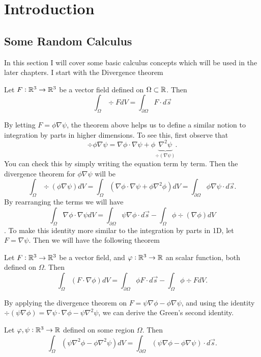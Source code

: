\chapter{Introduction}




\section{Some Random Calculus}
In this section I will cover some basic calculus concepts which will be used in the later chapters. I start with the Divergence theorem

\begin{theorem}
	Let $F:\mathbb{R}^3 \to \mathbb{R}^3$ be a vector field defined on $\Omega \subset \mathbb{R}$. Then
	\[ \int_{\Omega}\div{F}dV = \int_{\partial \Omega} F \cdot d\vec{s} \]
\end{theorem}

By letting $F = \phi\nabla\psi$, the theorem above helps us to define a similar notion to integration by parts in higher dimensions. To see this, first observe that
\[ \div{\phi\nabla\psi} = \nabla\phi\cdot\nabla\psi + \phi\underbrace{\nabla^2\psi}_{\div{(\nabla\psi)}}.  \]
You can check this by simply writing the equation term by term. Then the divergence theorem for $\phi\nabla\psi$ will be
\[ \int_\Omega \div{(\phi\nabla\psi)}dV = \int_\Omega (\nabla\phi\cdot\nabla\psi + \phi \nabla^2\phi) dV = \int_{\partial\Omega}\phi\nabla\psi\cdot d\vec{s}. \]
By rearranging the terms we will have
\[ \int_\Omega \nabla\phi\cdot\nabla\psi dV = \int_{\partial\Omega}\psi\nabla\phi \cdot d\vec{s} - \int_\Omega \phi \div{(\nabla\phi)} dV \].
To make this identity more similar to the integration by parts in 1D, let $F=\nabla\psi$. Then we will have the following theorem
\begin{theorem}
	Let $F:\mathbb{R}^3\to\mathbb{R}^3$ be a vector field, and $\varphi:\mathbb{R}^3\to\mathbb{R}$ an scalar function, both defined on $\Omega$. Then 
	\[\int_\Omega (F\cdot \nabla\phi)dV = \int_{\partial\Omega}\phi F \cdot d\vec{s} - \int_{\Omega}\phi \div{F} dV.  \]
\end{theorem}


By applying the divergence theorem on $F = \psi\nabla\phi - \phi\nabla\psi$, and using the identity $\div{(\psi\nabla\phi) = \nabla\psi\cdot\nabla\phi - \psi\nabla^2\psi}$, we can derive the Green's second identity.
\begin{theorem}
	Let $\varphi,\psi: \mathbb{R}^3 \to \mathbb{R}$ defined on some region $\Omega$. Then 
	\[ \int_\Omega (\psi\nabla^2\phi - \phi\nabla^2\psi)dV = \int_{\partial\Omega}(\psi\nabla\phi-\phi\nabla\psi)\cdot d\vec{s}. \]
\end{theorem}


